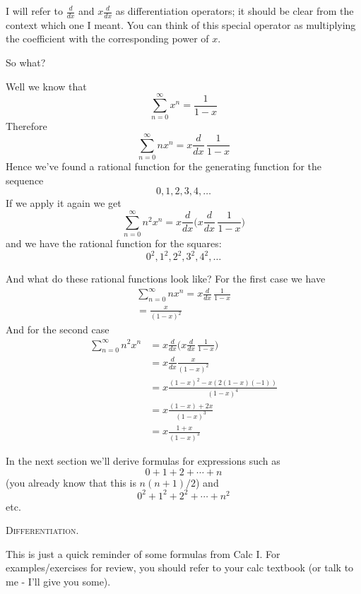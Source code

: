 I will refer to $\frac{d}{dx}$ and $x\frac{d}{dx}$ as differentiation
operators; it should be clear from the context which one I meant.
You can think of this special operator as multiplying the
coefficient with the corresponding power of $x$.

So what?

Well we know that
\[
\sum_{n=0}^\infty x^n = \frac{1}{1-x}
\]
Therefore
\[
\sum_{n=0}^\infty nx^n = x\frac{d}{dx} \, \frac{1}{1-x}
\]
Hence we've found a rational function for the generating function for
the sequence
\[
0, 1, 2, 3, 4, \ldots
\]
If we apply it again we get
\[
\sum_{n=0}^\infty n^2x^n = 
x\frac{d}{dx} 
\biggl( 
x\frac{d}{dx} \, \frac{1}{1-x}
\biggl)
\]
and we have the rational function for the squares:
\[
0^2, 1^2, 2^2, 3^2, 4^2, \ldots
\]

And what do these rational functions look like?
For the first case we have
\begin{align*}
\sum_{n=0}^\infty nx^n 
= x\frac{d}{dx} \, \frac{1}{1-x} \\
= \frac{x}{(1 - x)^2}
\end{align*}
And for the second case
\begin{align*}
\sum_{n=0}^\infty n^2x^n 
&= x\frac{d}{dx} \biggl( x \frac{d}{dx} \, \frac{1}{1-x} \biggr) \\
&= x\frac{d}{dx} \frac{x}{(1 - x)^2} \\
&= x \frac{(1-x)^2 - x(2(1-x)(-1))}{(1-x)^4} \\
&= x \frac{(1-x) + 2x}{(1-x)^3} \\
&= x \frac{1 + x}{(1-x)^3}
\end{align*}

In the next section we'll derive formulas for expressions such as
\[
0 + 1 + 2 + \cdots + n
\]
(you already know that this is $n(n+1)/2$) and
\[
0^2 + 1^2 + 2^2 + \cdots + n^2
\]
etc.






\newpage
\textsc{Differentiation.}

This is just a quick reminder of some formulas from Calc I.
For examples/exercises for review, 
you should refer to your calc textbook (or talk
to me - I'll give you some).

